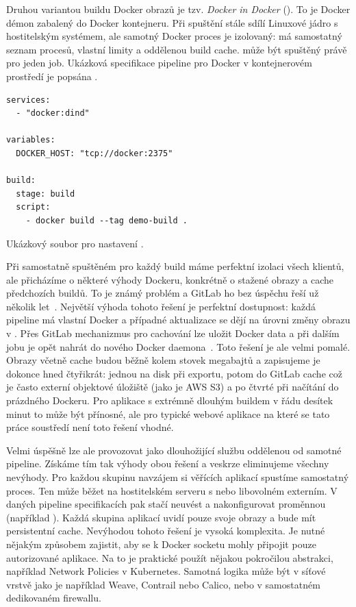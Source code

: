         Druhou variantou buildu Docker obrazů je tzv. \textit{Docker in Docker} (). To je Docker démon zabalený do Docker kontejneru. Při spuštění stále sdílí Linuxové jádro s hostitelským systémem, ale samotný Docker proces je izolovaný: má samostatný seznam procesů, vlastní limity a oddělenou build cache.  může být spuštěný právě pro jeden job. Ukázková specifikace pipeline pro Docker v kontejnerovém prostředí je popsána .

        \begin{iffigure}
            \begin{verbatim}
services:
  - "docker:dind"

variables:
  DOCKER_HOST: "tcp://docker:2375"

build:
  stage: build
  script:
    - docker build --tag demo-build .
            \end{verbatim}
            \caption{Ukázkový soubor  pro nastavení .}
            \label{fig:gitlab-dind}
        \end{iffigure}

        Při samostatně spuštěném  pro každý build máme perfektní izolaci všech klientů, ale přicházíme o některé výhody Dockeru, konkrétně o stažené obrazy a cache předchozích buildů. To je známý problém a GitLab ho bez úspěchu řeší už několik let~\cite{gitlab-docker-artifact-caching}. Největší výhoda tohoto řešení je perfektní dostupnost: každá pipeline má vlastní Docker a případné aktualizace se dějí na úrovni změny obrazu v . Přes GitLab mechanizmus pro cachování lze uložit Docker data a při dalším jobu je opět nahrát do nového Docker daemona~\cite{patel-docker-cache}. Toto řešení je ale velmi pomalé. Obrazy včetně cache budou běžně kolem stovek megabajtů a zapisujeme je dokonce hned čtyřikrát: jednou na disk při exportu, potom do GitLab cache což je často externí objektové úložiště (jako je AWS S3) a po čtvrté při načítání do prázdného Dockeru. Pro aplikace s extrémně dlouhým buildem v řádu desítek minut to může být přínosné, ale pro typické webové aplikace na které se tato práce soustředí není toto řešení vhodné.

        Velmi úspěšně lze ale  provozovat jako dlouhožijící službu oddělenou od samotné \CI pipeline. Získáme tím tak výhody obou řešení a veskrze eliminujeme všechny nevýhody. Pro každou skupinu navzájem si věřících aplikací spustíme samostatný  proces. Ten může běžet na hostitelském serveru s \CI nebo libovolném externím. V daných pipeline specifikacích pak stačí neuvést  a nakonfigurovat proměnnou  (například ). Každá skupina aplikací uvidí pouze svoje obrazy a bude mít persistentní cache. Nevýhodou tohoto řešení je vysoká komplexita. Je nutné nějakým způsobem zajistit, aby se k Docker socketu mohly připojit pouze autorizované aplikace. Na to je praktické použít nějakou pokročilou abstrakci, například Network Policies v Kubernetes. Samotná  logika může být v síťové vrstvě jako je například Weave, Contrail nebo Calico, nebo v samostatném dedikovaném firewallu.

